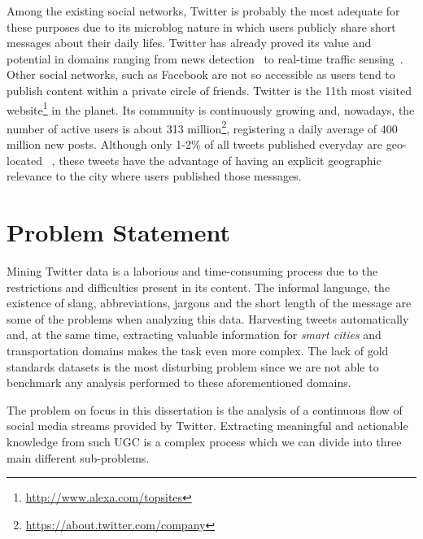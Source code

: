 Among the existing social networks, Twitter is probably the most adequate for these purposes due to its microblog nature in which users publicly share short messages about their daily lifes. Twitter has already proved its value and potential in domains ranging from news detection~\cite{kn:Sankaranarayanan2009} to real-time traffic sensing~\cite{carvalho2010real}. Other social networks, such as Facebook are not so accessible as users tend to publish content within a private circle of friends. Twitter is the 11th most visited website\footnote{\url{http://www.alexa.com/topsites}} in the planet. Its community is continuously growing and, nowadays, the number of active users is about 313 million\footnote{\url{https://about.twitter.com/company}}, registering a daily average of 400 million new posts. Although only 1-2\% of all tweets published everyday are geo-located ~\cite{ikeda2013twitter}, these tweets have the advantage of having an explicit geographic relevance to the city where users published those messages.

\section{Problem Statement}\label{sec:problem}

Mining Twitter data is a laborious and time-consuming process due to the restrictions and difficulties present in its content. The informal language, the existence of slang, abbreviations, jargons and the short length of the message are some of the problems when analyzing this data. Harvesting tweets automatically and, at the same time, extracting valuable information for \textit{smart cities} and transportation domains makes the task even more complex. The lack of gold standards datasets is the most disturbing problem since we are not able to benchmark any analysis performed to these aforementioned domains.


The problem on focus in this dissertation is the analysis of a continuous flow of social media streams provided by Twitter. Extracting meaningful and actionable knowledge from such \gls{UGC} is a complex process which we can divide into three main different sub-problems.

